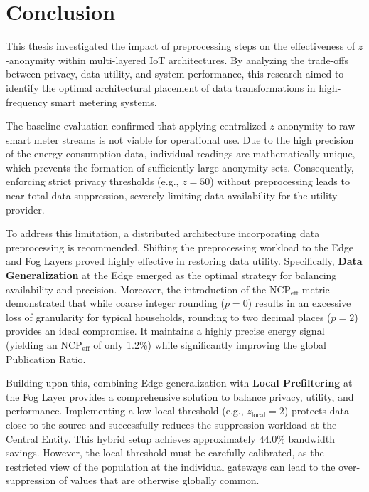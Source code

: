 \chapter{Conclusion}
\label{ch:conclusion}

This thesis investigated the impact of preprocessing steps on the effectiveness of $z$-anonymity within multi-layered \ac{IoT} architectures. By analyzing the trade-offs between privacy, data utility, and system performance, this research aimed to identify the optimal architectural placement of data transformations in high-frequency smart metering systems.

The baseline evaluation confirmed that applying centralized $z$-anonymity to raw smart meter streams is not viable for operational use. Due to the high precision of the energy consumption data, individual readings are mathematically unique, which prevents the formation of sufficiently large anonymity sets. Consequently, enforcing strict privacy thresholds (e.g., $z=50$) without preprocessing leads to near-total data suppression, severely limiting data availability for the utility provider.

To address this limitation, a distributed architecture incorporating data preprocessing is recommended. Shifting the preprocessing workload to the Edge and Fog Layers proved highly effective in restoring data utility. Specifically, \textbf{Data Generalization} at the Edge emerged as the optimal strategy for balancing availability and precision. Moreover, the introduction of the $\text{NCP}_{\text{eff}}$ metric demonstrated that while coarse integer rounding ($p=0$) results in an excessive loss of granularity for typical households, rounding to two decimal places ($p=2$) provides an ideal compromise. It maintains a highly precise energy signal (yielding an $\text{NCP}_{\text{eff}}$ of only 1.2\%) while significantly improving the global Publication Ratio. 

Building upon this, combining Edge generalization with \textbf{Local Prefiltering} at the Fog Layer provides a comprehensive solution to balance privacy, utility, and performance. Implementing a low local threshold (e.g., $z_{\text{local}}=2$) protects data close to the source and successfully reduces the suppression workload at the Central Entity. This hybrid setup achieves approximately 44.0\% bandwidth savings. However, the local threshold must be carefully calibrated, as the restricted view of the population at the individual gateways can lead to the over-suppression of values that are otherwise globally common.


